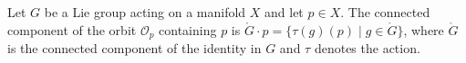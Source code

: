 Let $G$ be a Lie group acting on a manifold $X$ and let $p \in X$. The connected component of the orbit $\mathcal{O}_p$ containing $p$ is $\mathring{G} \cdot p = \{\tau(g)(p) \mid g \in \mathring{G}\}$, where $\mathring{G}$ is the connected component of the identity in $G$ and $\tau$ denotes the action.
